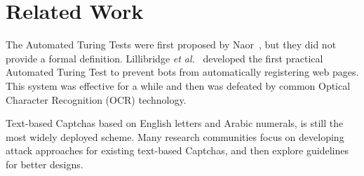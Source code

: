 \section{Related Work} 

The Automated Turing Tests were first proposed by Naor~\cite{Naor1996Verification}, but they did not provide a formal definition. Lillibridge \emph{et al.}~\cite{Lillibridge2001Method} developed the first practical Automated Turing Test to prevent bots from automatically registering web pages. This system was effective for a while and then was defeated by common Optical Character Recognition (OCR) technology.

Text-based Captchas based on English letters and Arabic numerals, is still the most widely deployed scheme. Many research communities focus on developing attack approaches for existing text-based Captchas, and then explore guidelines for better designs. 